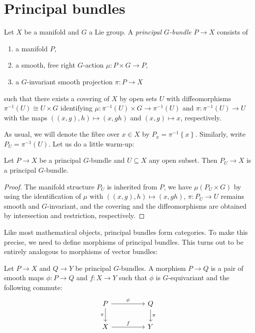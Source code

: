 \documentclass{article}
\begin{document}
\section{Principal bundles}

\begin{definition}
  Let $X$ be a manifold and $G$ a Lie group. A \emph{principal $G$-bundle
  $P\to X$} consists of
  \begin{enumerate}
    \item a manifold $P$,
    \item a smooth, free right $G$-action $\mu:P\times G\to P$,
    \item a $G$-invariant smooth projection $\pi:P\to X$
  \end{enumerate}
  such that there exists a covering of $X$ by open sets
  $U$ with diffeomorphisms ${\pi}^{-1}(U)\cong U\times G$
  identifying $\mu : {\pi}^{-1}(U)\times G\to{\pi}^{-1}(U)$
  and $\pi:{\pi}^{-1}(U)\to U$ with the maps
  $((x,g),h)\mapsto (x,gh)$ and $(x,g)\mapsto x$, respectively.
\end{definition}

As usual, we will denote the fibre over $x\in X$ by $P_x = {\pi}^{-1}\left\lbrace{x}\right\rbrace$. Similarly, write $P_U = {\pi}^{-1}(U)$.
Let us do a little warm-up:

\begin{lemma}
  Let $P\to X$ be a principal $G$-bundle and $U\subseteq X$ any open
  subset. Then $P_U\to X$ is a principal $G$-bundle.
  \begin{proof}
    The manifold structure $P_U$ is inherited from $P$,
    we have $\mu(P_U\times G)$ by using the identification
    of $\mu$ with $((x,g),h)\mapsto (x,gh)$, $\pi:P_U\to U$
    remains smooth and $G$-invariant, and the covering and the
    diffeomorphisms are obtained by intersection and restriction, respectively.
  \end{proof}
\end{lemma}

Like most mathematical objects, principal bundles form categories.
To make this precise, we need to define morphisms of principal bundles.
This turns out to be entirely analogous to morphisms of vector
bundles:

\begin{definition}
  Let $P \to X$ and $Q\to Y$ be principal $G$-bundles.
  A morphism $P\to Q$ is a pair of smooth maps $\phi:P\to Q$ and $f:X\to Y$
  such that $\phi$ is $G$-equivariant and the following commute:
  \begin{equation*}
    \begin{tikzcd}
      P && Q \\
      X && Y
      \arrow["\phi", from=1-1, to=1-3]
      \arrow["f", from=2-1, to=2-3]
      \arrow["\pi"', from=1-1, to=2-1]
      \arrow["\pi", from=1-3, to=2-3]
    \end{tikzcd}
  \end{equation*}
\end{definition}
\end{document}
